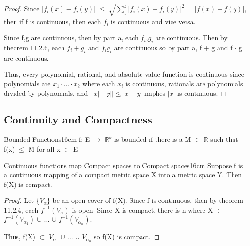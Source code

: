     \begin{proof}
        Since $|f_i(x) - f_i(y)|$
        $\leq$ $\sqrt{\sum_1^k |f_i(x) - f_i(y)|^2}$
        = $|f(x) - f(y)|$, then if f is continuous, then
        each $f_i$ is continuous and vice versa.

        \vspace{0.2cm}

        Since f,g are continuous, then by part a, each $f_i$,$g_i$ are continuous.
        Then by {\color{red} theorem 11.2.6},
        each $f_i + g_i$ and $f_i g_i$ are continuous so
        by part a, f + g and f $\cdot$ g are continuous.

        \vspace{0.2cm}

        Thus, every polynomial, rational, and absolute value function is continuous
        since polynomials are $x_1 \cdot ... \cdot x_k$ where each $x_i$
        is continuous, rationals are polynomials divided by polynomials,
        and $||x| - |y|| \leq |x - y|$ implies $|x|$ is continuous.
    \end{proof}

    \newpage





\subsection{ Continuity and Compactness }

    \begin{definition}{Bounded Functions}{16cm}
        f: E $\rightarrow$ $\mathbb{R}^k$ is {\color{lblue} bounded} if there is a
        M $\in$ $\mathbb{R}$ such that f(x) $\leq$ M for all x $\in$ E     
    \end{definition}

    \vspace{0.5cm}



    \begin{wtheorem}{Continuous functions map Compact spaces to Compact spaces}{16cm}
        Suppose f is a continuous mapping of a compact metric space X
        into a metric space Y. Then f(X) is compact.        
    \end{wtheorem}

    \begin{proof}
        Let \{$V_{\alpha}$\} be an open cover of f(X).
        Since f is continuous, then by {\color{red} theorem 11.2.4},
        each $f^{-1}(V_{\alpha})$ is open.
        Since X is compact, there is n where
        X $\subset$ $f^{-1}(V_{\alpha_1})$ $\cup$ ... $\cup$ $f^{-1}(V_{\alpha_n})$.

        Thus, f(X) $\subset$ $V_{\alpha_1}$ $\cup$ ... $\cup$ $V_{\alpha_n}$
        so f(X) is compact.
    \end{proof}



